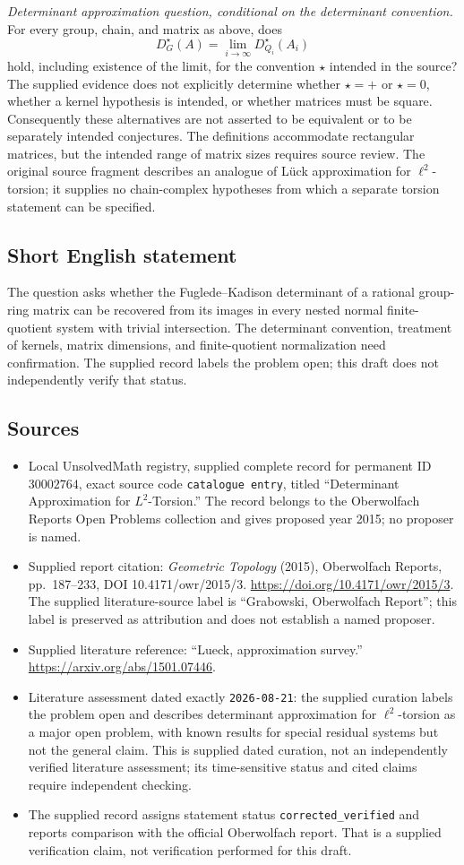 \documentclass[11pt]{article}
\begin{document}
\emph{Determinant approximation question, conditional on the determinant convention.} For every group, chain, and matrix as above, does
\[
D_G^{\star}(A)=\lim_{i\to\infty}D_{Q_i}^{\star}(A_i)
\]
hold, including existence of the limit, for the convention \(\star\) intended in the source? The supplied evidence does not explicitly determine whether \(\star=+\) or \(\star=0\), whether a kernel hypothesis is intended, or whether matrices must be square. Consequently these alternatives are not asserted to be equivalent or to be separately intended conjectures. The definitions accommodate rectangular matrices, but the intended range of matrix sizes requires source review. The original source fragment describes an analogue of L\"uck approximation for \(\ell^2\)-torsion; it supplies no chain-complex hypotheses from which a separate torsion statement can be specified.
\subsection{Short English statement}
The question asks whether the Fuglede--Kadison determinant of a rational group-ring matrix can be recovered from its images in every nested normal finite-quotient system with trivial intersection. The determinant convention, treatment of kernels, matrix dimensions, and finite-quotient normalization need confirmation. The supplied record labels the problem open; this draft does not independently verify that status.
\subsection{Sources}
\begin{itemize}
\item Local UnsolvedMath registry, supplied complete record for permanent ID \(30002764\), exact source code \texttt{catalogue entry}, titled ``Determinant Approximation for \(L^2\)-Torsion.'' The record belongs to the Oberwolfach Reports Open Problems collection and gives proposed year 2015; no proposer is named.
\item Supplied report citation: \emph{Geometric Topology} (2015), Oberwolfach Reports, pp.\ 187--233, DOI 10.4171/owr/2015/3. \url{https://doi.org/10.4171/owr/2015/3}. The supplied literature-source label is ``Grabowski, Oberwolfach Report''; this label is preserved as attribution and does not establish a named proposer.
\item Supplied literature reference: ``Lueck, approximation survey.'' \url{https://arxiv.org/abs/1501.07446}.
\item Literature assessment dated exactly \texttt{2026-08-21}: the supplied curation labels the problem open and describes determinant approximation for \(\ell^2\)-torsion as a major open problem, with known results for special residual systems but not the general claim. This is supplied dated curation, not an independently verified literature assessment; its time-sensitive status and cited claims require independent checking.
\item The supplied record assigns statement status \texttt{corrected\_verified} and reports comparison with the official Oberwolfach report. That is a supplied verification claim, not verification performed for this draft.
\end{itemize}
\end{document}
